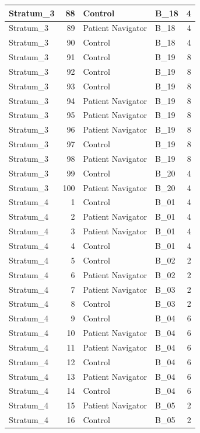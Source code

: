 \documentclass[
]{book}
\begin{document}
\begin{table}[H]
\begin{tabular}{l|r|l|l|r}
\hline
Stratum\_3 & 88 & Control & B\_18 & 4\\
\hline
Stratum\_3 & 89 & Patient Navigator & B\_18 & 4\\
\hline
Stratum\_3 & 90 & Control & B\_18 & 4\\
\hline
Stratum\_3 & 91 & Control & B\_19 & 8\\
\hline
Stratum\_3 & 92 & Control & B\_19 & 8\\
\hline
Stratum\_3 & 93 & Control & B\_19 & 8\\
\hline
Stratum\_3 & 94 & Patient Navigator & B\_19 & 8\\
\hline
Stratum\_3 & 95 & Patient Navigator & B\_19 & 8\\
\hline
Stratum\_3 & 96 & Patient Navigator & B\_19 & 8\\
\hline
Stratum\_3 & 97 & Control & B\_19 & 8\\
\hline
Stratum\_3 & 98 & Patient Navigator & B\_19 & 8\\
\hline
Stratum\_3 & 99 & Control & B\_20 & 4\\
\hline
Stratum\_3 & 100 & Patient Navigator & B\_20 & 4\\
\hline
Stratum\_4 & 1 & Control & B\_01 & 4\\
\hline
Stratum\_4 & 2 & Patient Navigator & B\_01 & 4\\
\hline
Stratum\_4 & 3 & Patient Navigator & B\_01 & 4\\
\hline
Stratum\_4 & 4 & Control & B\_01 & 4\\
\hline
Stratum\_4 & 5 & Control & B\_02 & 2\\
\hline
Stratum\_4 & 6 & Patient Navigator & B\_02 & 2\\
\hline
Stratum\_4 & 7 & Patient Navigator & B\_03 & 2\\
\hline
Stratum\_4 & 8 & Control & B\_03 & 2\\
\hline
Stratum\_4 & 9 & Control & B\_04 & 6\\
\hline
Stratum\_4 & 10 & Patient Navigator & B\_04 & 6\\
\hline
Stratum\_4 & 11 & Patient Navigator & B\_04 & 6\\
\hline
Stratum\_4 & 12 & Control & B\_04 & 6\\
\hline
Stratum\_4 & 13 & Patient Navigator & B\_04 & 6\\
\hline
Stratum\_4 & 14 & Control & B\_04 & 6\\
\hline
Stratum\_4 & 15 & Patient Navigator & B\_05 & 2\\
\hline
Stratum\_4 & 16 & Control & B\_05 & 2\\

\end{tabular}
\end{table}
\end{document}
